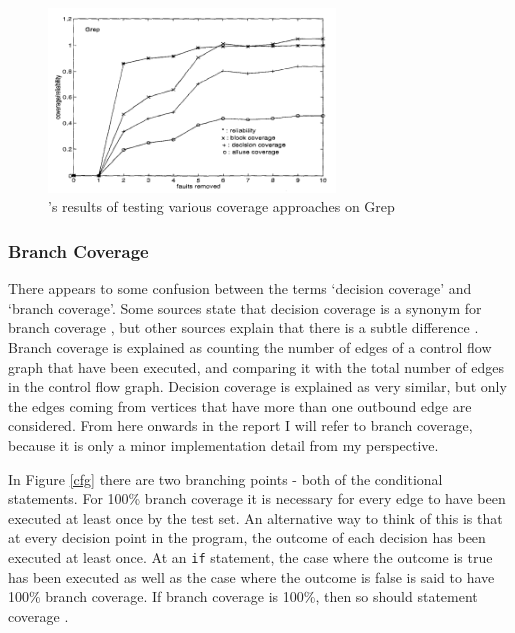 \begin{figure}
\begin{minipage}{0.49\textwidth}
\centering
\includegraphics[width=3in]{figures/coverage_reliability.png}
\caption{\citet{497650}'s results of testing various coverage approaches on Grep}
\label{coverageReliability}
\end{minipage}
\end{figure}

\subsubsection{Branch Coverage}

There appears to some confusion between the terms `decision coverage' and `branch coverage'. Some sources state that decision coverage is a synonym for branch coverage \citep{softwareTestingBranchDecision, hitexBranchDecision}, but other sources explain that there is a subtle difference \citep{tmgBranchDecision, bullsEyeBranchDecision}. Branch coverage is explained as counting the number of edges of a control flow graph that have been executed, and comparing it with the total number of edges in the control flow graph. Decision coverage is explained as very similar, but only the edges coming from vertices that have more than one outbound edge are considered. From here onwards in the report I will refer to branch coverage, because it is only a minor implementation detail from my perspective.

In Figure \ref{cfg} there are two branching points - both of the conditional statements. For 100\% branch coverage it is necessary for every edge to have been executed at least once by the test set. An alternative way to think of this is that at every decision point in the program, the outcome of each decision has been executed at least once. At an \verb+if+ statement, the case where the outcome is true has been executed as well as the case where the outcome is false is said to have 100\% branch coverage. If branch coverage is 100\%, then so should statement coverage \citep{Myers:2004:AST:983238}.

